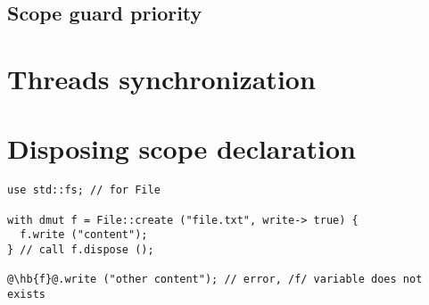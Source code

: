 \subsection{Scope guard priority}

\section{Threads synchronization}

\section{Disposing scope declaration}%
\label{sec:dispose_block}

\begin{lstlisting}[style=coloredverbatim, escapechar=@]
use std::fs; // for File

with dmut f = File::create ("file.txt", write-> true) {
  f.write ("content");
} // call f.dispose ();

@\hb{f}@.write ("other content"); // error, /f/ variable does not exists
\end{lstlisting}
